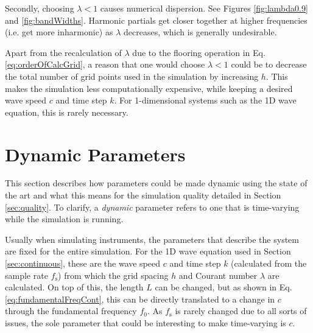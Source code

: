 \documentclass[dvipsnames, reprint]{JASA}
\def\SWcomment[#1]{\textcolor{Bittersweet}{#1}}
\begin{document}
Secondly, choosing $\lambda < 1$ causes numerical dispersion. See Figures \ref{fig:lambda0.9} and \ref{fig:bandWidths}. Harmonic partials get closer together at higher frequencies (i.e. get more inharmonic) as $\lambda$ decreases, which is generally undesirable.

Apart from the recalculation of $\lambda$ due to the flooring operation in Eq. \eqref{eq:orderOfCalcGrid}, a reason that one would choose $\lambda < 1$ could be to decrease the total number of grid points used in the simulation by increasing $h$. This makes the simulation less computationally expensive, while keeping a desired wave speed $c$ and time step $k$. For 1-dimensional systems such as the 1D wave equation, this is rarely necessary.

\section{Dynamic Parameters}
This section describes how parameters could be made dynamic using the state of the art and what this means for the simulation quality detailed in Section \ref{sec:quality}. %
To clarify, a \textit{dynamic} parameter refers to one that is time-varying while the simulation is running. 


Usually when simulating instruments, the parameters that describe the system are fixed for the entire simulation. For the 1D wave equation used in Section \ref{sec:continuous}, these are the wave speed $c$ and time step $k$ (calculated from the sample rate $f_\text{s}$) from which the grid spacing $h$ and Courant number $\lambda$ are calculated. On top of this, the length $L$ can be changed, but as shown in Eq. \eqref{eq:fundamentalFreqCont}, this can be directly translated to a change in $c$ through the fundamental frequency $f_0$. As $f_\text{s}$ is rarely changed \SWcomment[due to all sorts of issues], the sole parameter that could be interesting to make time-varying is $c$. 
\end{document}
